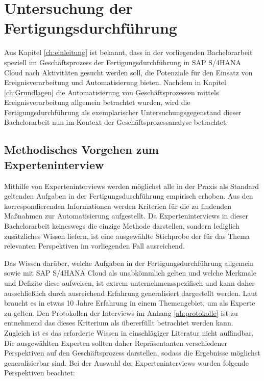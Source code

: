 \section{Untersuchung der Fertigungsdurchführung}\label{sec:untersuchung}

Aus Kapitel \ref{ch:einleitung} ist bekannt, dass in der vorliegenden Bachelorarbeit speziell im Geschäftsprozess der Fertigungsdurchführung in SAP S/4HANA Cloud nach Aktivitäten gesucht werden soll, die Potenziale für den Einsatz von Ereignisverarbeitung und Automatisierung bieten. 
Nachdem in Kapitel \ref{ch:Grundlagen} die Automatisierung von Geschäftsprozessen mittels Ereignisverarbeitung allgemein betrachtet wurden, wird die Fertigungsdurchführung als exemplarischer Untersuchungsgegenstand dieser Bachelorarbeit nun im Kontext der Geschäftsprozessanalyse betrachtet. 

\subsection{Methodisches Vorgehen zum Experteninterview}
Mithilfe von Experteninterviews werden möglichst alle in der Praxis als Standard geltenden Aufgaben in der Fertigungsdurchführung empirisch erhoben.
\cite{Kaiser.2014}
Aus den korrespondierenden Informationen werden Kriterien für die zu findenden Maßnahmen zur Automatisierung aufgestellt. 
Da Experteninterviews in dieser Bachelorarbeit keineswegs die einzige Methode darstellen, sondern lediglich zusätzliches Wissen liefern, ist eine ausgewählte Stichprobe der für das Thema relevanten Perspektiven im vorliegenden Fall ausreichend.

Das Wissen darüber, welche Aufgaben in der Fertigungsdurchführung allgemein sowie mit SAP S/4HANA Cloud als unabkömmlich gelten und welche Merkmale und Defizite diese aufweisen, ist extrem unternehmensspezifisch und kann daher ausschließlich durch ausreichend Erfahrung generalisiert dargestellt werden. 
Laut \citeauthor{Mieg.2005} braucht es in etwas 10 Jahre Erfahrung in einem Themengebiet, um als Experte zu gelten.
\cite{Mieg.2005} Den Protokollen der Interviews im Anhang \ref{ah:protokolle} ist zu entnehmend das dieses Kriterium als übererfüllt betrachtet werden kann.
Zugleich ist es das erforderte Wissen in einschlägiger Literatur nicht auffindbar.
Die ausgewählten Experten sollten daher Repräsentanten verschiedener Perspektiven auf den Geschäftsprozess darstellen, sodass die Ergebnisse möglichst generalisierbar sind. 
Bei der Auswahl der Experteninterviews wurden folgende Perspektiven beachtet:

